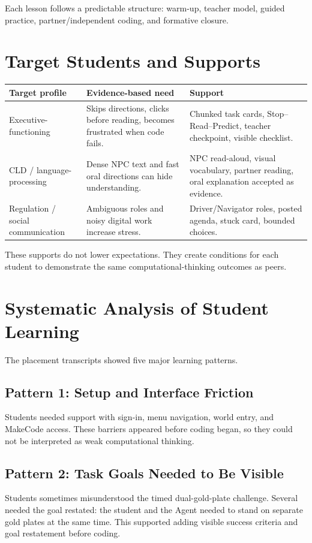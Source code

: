 \documentclass[12pt]{article}
\begin{document}
Each lesson follows a predictable structure: warm-up, teacher model, guided practice, partner/independent coding, and formative closure.

\section{Target Students and Supports}
\begin{longtable}{@{}P{1.5in}P{2.2in}P{2.7in}@{}}
\toprule
\textbf{Target profile} & \textbf{Evidence-based need} & \textbf{Support} \\
\midrule
Executive-functioning & Skips directions, clicks before reading, becomes frustrated when code fails. & Chunked task cards, Stop--Read--Predict, teacher checkpoint, visible checklist. \\
CLD / language-processing & Dense NPC text and fast oral directions can hide understanding. & NPC read-aloud, visual vocabulary, partner reading, oral explanation accepted as evidence. \\
Regulation / social communication & Ambiguous roles and noisy digital work increase stress. & Driver/Navigator roles, posted agenda, stuck card, bounded choices. \\
\bottomrule
\end{longtable}

These supports do not lower expectations. They create conditions for each student to demonstrate the same computational-thinking outcomes as peers.

\section{Systematic Analysis of Student Learning}
The placement transcripts showed five major learning patterns.

\subsection{Pattern 1: Setup and Interface Friction}
Students needed support with sign-in, menu navigation, world entry, and MakeCode access. These barriers appeared before coding began, so they could not be interpreted as weak computational thinking.

\subsection{Pattern 2: Task Goals Needed to Be Visible}
Students sometimes misunderstood the timed dual-gold-plate challenge. Several needed the goal restated: the student and the Agent needed to stand on separate gold plates at the same time. This supported adding visible success criteria and goal restatement before coding.
\end{document}
